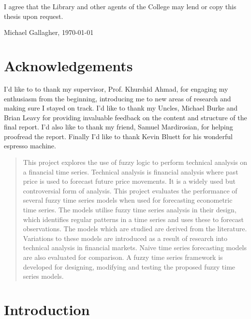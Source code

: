 \documentclass[12pt, oneside, a4paper]{article}
\theoremstyle{definition}
\begin{document}
I agree that the Library and other agents of
the College may lend or copy this thesis upon request.

\begin{center}
\vspace*{2in}

Michael Gallagher, \today

\end{center}

\section*{Acknowledgements}
\thispagestyle{empty}
\noindent
I'd like to to thank my supervisor, Prof. Khurshid Ahmad, for engaging my enthusiasm from the beginning, introducing me to new areas of research and making sure I stayed on track. I'd like to thank my Uncles, Michael Burke and Brian Leavy for providing invaluable feedback on the content and structure of the final report. I'd also like to thank my friend, Samuel Mardirosian, for helping proofread the report. Finally I'd like to thank Kevin Bluett for his wonderful espresso machine.
\newpage

\begin{abstract}
\noindent
This project explores the use of fuzzy logic to perform technical analysis on a financial time series. Technical analysis is financial analysis where past price is used to forecast future price movements. It is a widely used but controversial form of analysis. This project evaluates the performance of several fuzzy time series models when used for forecasting econometric time series. The models utilise fuzzy time series analysis in their design, which identifies regular patterns in a time series and uses these to forecast observations. The models which are studied are derived from the literature. Variations to these models are introduced as a result of research into technical analysis in financial markets. Naive time series forecasting models are also evaluated for comparison. A fuzzy time series framework is developed for designing, modifying and testing the proposed fuzzy time series models.

\end{abstract}

\tableofcontents

\listoffigures
\listoftables
\newpage

\section{Introduction}
\end{document}
